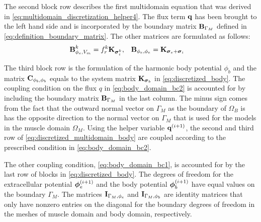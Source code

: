 The second block row describes the first multidomain equation that was derived in \cref{eq:multidomain_discretization_helper4}. The flux term $\textbf{q}$ has been brought to the left hand side and is incorporated by the boundary matrix $\textbf{B}_{\Gamma_M}$ defined in \cref{eq:definition_boundary_matrix}. The other matrices are formulated as follows:
%
\begin{align*}
  \textbf{B}_{\phi_e,V_m}^k &= f_r^k \textbf{K}_{\boldsymbol{\sigma}_i^k}, & 
  \textbf{B}_{\phi_e,\phi_e} &= \textbf{K}_{\boldsymbol{\sigma}_e + \boldsymbol{\sigma}_i}
\end{align*}
%

The third block row is the formulation of the harmonic body potential $\phi_b$ and the matrix $\textbf{C}_{\phi_b,\phi_b}$ equals to the system matrix $\textbf{K}_{\boldsymbol{\sigma}_b}$ in \cref{eq:discretized_body}. The coupling condition on the flux $q$ in  \cref{eq:body_domain_bc2} is accounted for by including the boundary matrix $\textbf{B}_{\Gamma_M}$ in the last column. The minus sign comes from the fact that the outward normal vector on $\Gamma_M$ as the boundary of $\Omega_B$ is has the opposite direction to the normal vector on $\Gamma_M$ that is used for the models in the muscle domain $\Omega_M$. Using the helper variable $\textbf{q}^{(i+1)}$, the second and third row of \cref{eq:discretized_multidomain_body} are coupled according to the prescribed condition in \cref{eq:body_domain_bc2}.

The other coupling condition, \cref{eq:body_domain_bc1}, is accounted for by the last row of blocks in \cref{eq:discretized_body}. The degrees of freedom for the extracellular potential $\boldsymbol{\phi}_e^{(i+1)}$ and the body potential $\boldsymbol{\phi}_b^{(i+1)}$ have equal values on the boundary $\Gamma_M$. The matrices $\textbf{I}_{\Gamma_M,\phi_e}$ and $\textbf{I}_{\Gamma_M,\phi_b}$ are identity matrices that only have nonzero entries on the diagonal for the boundary degrees of freedom in the meshes of muscle domain and body domain, respectively.


